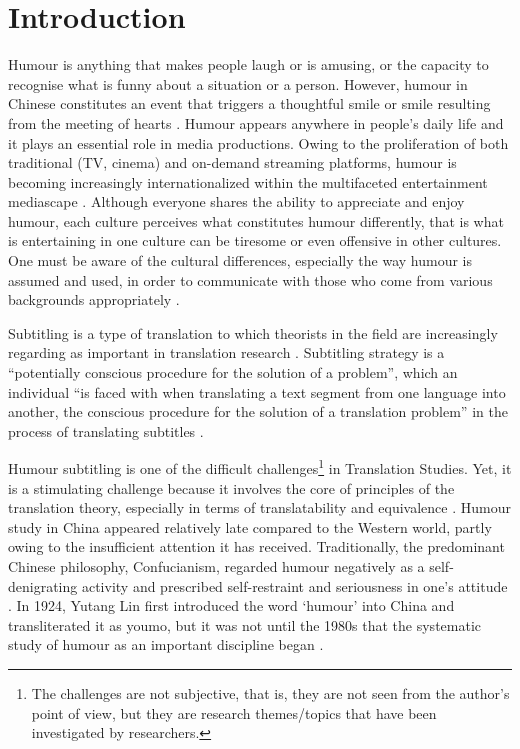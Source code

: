 \documentclass[english]{textolivre}
\begin{document}
\section{Introduction}\label{sec-intro}
Humour is anything that makes people laugh or is amusing, or the capacity to recognise what is funny about a situation or a person. However, humour in Chinese constitutes an event that triggers a thoughtful smile or smile resulting from the meeting of hearts \cite{lin_impressions_1936}. Humour appears anywhere in people's daily life and it plays an essential role in media productions. Owing to the proliferation of both traditional (TV, cinema) and on-demand streaming platforms, humour is becoming increasingly internationalized within the multifaceted entertainment mediascape \cite{dore_editorial:_2019}. Although everyone shares the ability to appreciate and enjoy humour, each culture perceives what constitutes humour differently, that is what is entertaining in one culture can be tiresome or even offensive in other cultures. One must be aware of the cultural differences, especially the way humour is assumed and used, in order to communicate with those who come from various backgrounds appropriately \cite{amini_quality_2013}. 

Subtitling is a type of translation to which theorists in the field are increasingly regarding as important in translation research \cite{pardo_translation_2013}. Subtitling strategy is a ``potentially conscious procedure for the solution of a problem'', which an individual “is faced with when translating a text segment from one language into another, the conscious procedure for the solution of a translation problem” in the process of translating subtitles \cite[p.~91]{lorscher_translation_1991}.

Humour subtitling is one of the difficult challenges\footnote{The challenges are not subjective, that is, they are not seen from the author’s point of view, but they are research themes/topics that have been investigated by researchers.} in Translation Studies. Yet, it is a stimulating challenge because it involves the core of principles of the translation theory, especially in terms of translatability and equivalence \cite{chiaro_humor_2005,yap_problems_2018}. Humour study in China appeared relatively late compared to the Western world, partly owing to the insufficient attention it has received. Traditionally, the predominant Chinese philosophy, Confucianism, regarded humour negatively as a self-denigrating activity and prescribed self-restraint and seriousness in one's attitude \cite{jiang_cultural_2019}. In 1924, Yutang Lin first introduced the word `humour' into China and transliterated it as youmo, but it was not until the 1980s that the systematic study of humour as an important discipline began \cite{chen_personal_1993}. 
\end{document}
